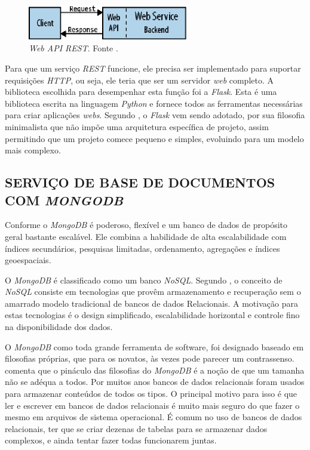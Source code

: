\begin{figure}[ht]
	\centering
	\includegraphics[width=7cm]{figuras/rest_api.eps}
	\caption{\emph{Web API REST}. Fonte \cite{Masse2011}.}
	\label{rest_api}
\end{figure}


Para que um serviço \emph{REST} funcione, ele precisa ser implementado para suportar requisições \emph{HTTP}, ou seja, ele teria que ser um servidor \emph{web} completo. 
A biblioteca escolhida para desempenhar esta função foi a \emph{Flask}. 
Esta é uma biblioteca escrita na linguagem \emph{Python} e fornece todos as ferramentas necessárias para criar aplicações \emph{webs}. 
Segundo , o \emph{Flask} vem sendo adotado, por sua filosofia minimalista que não impõe uma arquitetura específica de projeto, assim permitindo que um projeto comece pequeno e simples, evoluindo para um modelo mais complexo.


\subsection{SERVIÇO DE BASE DE DOCUMENTOS COM \emph{MONGODB}}
\label{mongodb_sec}

Conforme  o \emph{MongoDB} é poderoso, flexível e um banco de dados de propósito geral bastante escalável. Ele combina a habilidade de alta escalabilidade com índices secundários, pesquisas limitadas, ordenamento, agregações e índices geoespaciais.

O \emph{MongoDB} é classificado como um banco \emph{NoSQL}. Segundo , o conceito de \emph{NoSQL} consiste em tecnologias que provêm armazenamento e recuperação sem o amarrado modelo tradicional de bancos de dados Relacionais. A motivação para estas tecnologias é o design simplificado, escalabilidade horizontal e controle fino na disponibilidade dos dados.

O \emph{MongoDB} como toda grande ferramenta de software, foi designado baseado em filosofias próprias, que para os novatos, às vezes pode parecer um contrassenso. 
 comenta que o pináculo das filosofias do \emph{MongoDB} é a noção de que um tamanha não se adéqua a todos. Por muitos anos bancos de dados relacionais foram usados para armazenar conteúdos de todos os tipos. O principal motivo para isso é que ler e escrever em bancos de dados relacionais é muito mais seguro do que fazer o mesmo em arquivos de sistema operacional.
É comum no uso de bancos de dados relacionais, ter que se criar dezenas de tabelas para se armazenar dados complexos, e ainda tentar fazer todas funcionarem juntas.

